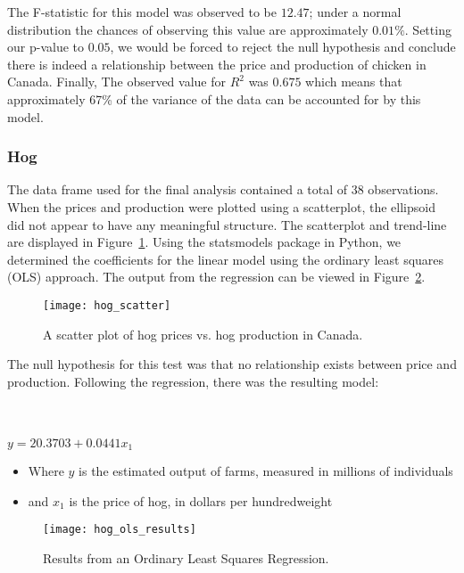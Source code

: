 The F-statistic for this model was observed to be $12.47$; under a normal distribution the chances of observing this value are approximately $0.01\%$.
Setting our p-value to $0.05$, we would be forced to reject the null hypothesis and conclude there is indeed a relationship between the price and production of chicken in Canada.
Finally, The observed value for $R^2$ was $0.675$ which means that approximately 67\% of the variance of the data can be accounted for by this model.

\subsubsection{Hog}

The data frame used for the final analysis contained a total of 38 observations.
When the prices and production were plotted using a scatterplot, the ellipsoid did not appear to have any meaningful structure.
The scatterplot and trend-line are displayed in Figure~\ref{fig:hog_scatter}.
Using the statsmodels package in Python, we determined the coefficients for the linear model using the ordinary least squares (OLS) approach.
The output from the regression can be viewed in Figure~\ref{fig:hog_ols}.

\begin{figure}
    \texttt{[image: hog\_scatter]}
    \caption{A scatter plot of hog prices vs. hog production in Canada.}
    \label{fig:hog_scatter}
\end{figure}

The null hypothesis for this test was that no relationship exists between price and production.
Following the regression, there was the resulting model:

\\~\\

\tabto{5cm} $y = 20.3703 + 0.0441x_1$

\begin{itemize}
    \item Where $y$ is the estimated output of farms, measured in millions of individuals
    \item and $x_1$ is the price of hog, in dollars per hundredweight
\end{itemize}

\begin{figure}
    \texttt{[image: hog\_ols\_results]}
    \caption{Results from an Ordinary Least Squares Regression.}
    \label{fig:hog_ols}
\end{figure}


